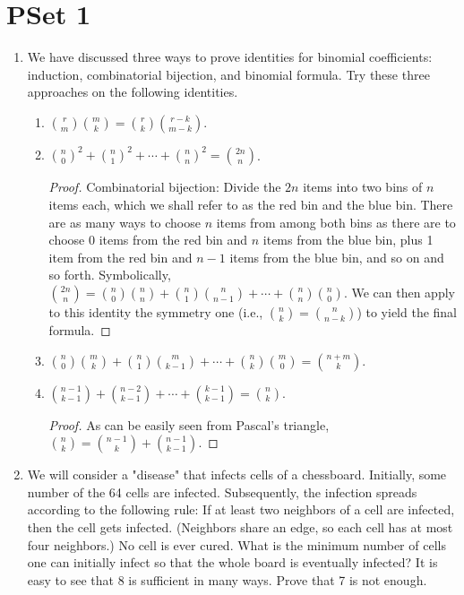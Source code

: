 \documentclass[../main.tex]{subfiles}
\begin{document}
\section{PSet 1}
\begin{enumerate}
    \item We have discussed three ways to prove identities for binomial coefficients: induction, combinatorial bijection, and binomial formula. Try these three approaches on the following identities.
    \begin{enumerate}
        \item $\binom{r}{m}\binom{m}{k}=\binom{r}{k}\binom{r-k}{m-k}$.
        \item $\binom{n}{0}^2+\binom{n}{1}^2+\cdots+\binom{n}{n}^2=\binom{2n}{n}$.
        \begin{proof}
            Combinatorial bijection: Divide the $2n$ items into two bins of $n$ items each, which we shall refer to as the red bin and the blue bin. There are as many ways to choose $n$ items from among both bins as there are to choose 0 items from the red bin and $n$ items from the blue bin, plus 1 item from the red bin and $n-1$ items from the blue bin, and so on and so forth. Symbolically, $\binom{2n}{n}=\binom{n}{0}\binom{n}{n}+\binom{n}{1}\binom{n}{n-1}+\cdots+\binom{n}{n}\binom{n}{0}$. We can then apply to this identity the symmetry one (i.e., $\binom{n}{k}=\binom{n}{n-k}$) to yield the final formula.
        \end{proof}
        \item $\binom{n}{0}\binom{m}{k}+\binom{n}{1}\binom{m}{k-1}+\cdots+\binom{n}{k}\binom{m}{0}=\binom{n+m}{k}$.
        \item $\binom{n-1}{k-1}+\binom{n-2}{k-1}+\cdots+\binom{k-1}{k-1}=\binom{n}{k}$.
        \begin{proof}
            As can be easily seen from Pascal's triangle, $\binom{n}{k}=\binom{n-1}{k}+\binom{n-1}{k-1}$.
        \end{proof}
    \end{enumerate}
    \item We will consider a "disease" that infects cells of a chessboard. Initially, some number of the 64 cells are infected. Subsequently, the infection spreads according to the following rule: If at least two neighbors of a cell are infected, then the cell gets infected. (Neighbors share an edge, so each cell has at most four neighbors.) No cell is ever cured. What is the minimum number of cells one can initially infect so that the whole board is eventually infected? It is easy to see that 8 is sufficient in many ways. Prove that 7 is not enough.

\end{enumerate}
\end{document}
